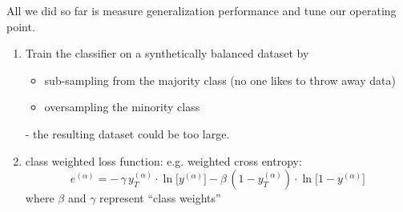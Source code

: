 \begin{frame}

All we did so far is measure generalization performance and tune our operating point.


\pause

\begin{enumerate}
\item Train the classifier on a synthetically balanced dataset by
\begin{itemize}
\item sub-sampling from the majority class (no one likes to throw away data)
\item oversampling the minority class
\end{itemize}


\pause

- the resulting dataset could be too large.
\item class weighted loss function:
e.g. weighted cross entropy:
\begin{equation}
e^{(\alpha)} = -\, \gamma \, y_T^{(\alpha)} \cdot \ln \lbrack y^{(\alpha)} \rbrack - \beta \, (1-y_T^{(\alpha)}) \cdot \ln \lbrack 1-y^{(\alpha)} \rbrack
\end{equation}
where $\beta$ and $\gamma$ represent ``class weights''
\end{enumerate}


\end{frame}



